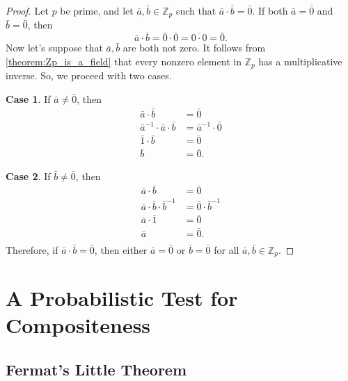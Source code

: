 \documentclass[12pt, titlepage]{amsart}
\newcommand\Z{{\mathbb Z}}
\newcommand\N{{\mathbb N}}
\newtheorem{theorem}{Theorem}[subsection]
\theoremstyle{definition}
\begin{document}
	\begin{proof}
		Let $p$ be prime, and let $\bar{a}, \bar{b} \in \Z_p$ such that $\bar{a} \cdot \bar{b} = \bar{0}$.
		If both $\bar{a} = \bar{0}$ and $\bar{b} = \bar{0}$, then $$\bar{a} \cdot \bar{b} = \bar{0} \cdot \bar{0} = \overline{0 \cdot 0} = \bar{0}.$$
		Now let's suppose that $\bar{a}, \bar{b}$ are both not zero.
		It follows from \cref{theorem:Zp_is_a_field} that every nonzero element in $\Z_p$ has a multiplicative inverse.
		So, we proceed with two cases.
		
		\textbf{Case 1}. If $\bar{a} \neq \bar{0}$, then 
		\begin{align*}
			\bar{a} \cdot \bar{b} &= \bar{0} \\
			\bar{a}^{-1} \cdot \bar{a} \cdot \bar{b} &= \bar{a}^{-1} \cdot \bar{0} \\
			\bar{1} \cdot \bar{b} &= \bar{0} \\
			\bar{b} &= \bar{0}.
		\end{align*}
		
		\textbf{Case 2}. If $\bar{b} \neq \bar{0}$, then 
		\begin{align*}
		\bar{a} \cdot \bar{b} &= \bar{0} \\
		\bar{a} \cdot \bar{b} \cdot \bar{b}^{-1} &= \bar{0} \cdot \bar{b}^{-1} \\
		\bar{a} \cdot \bar{1} &= \bar{0} \\
		\bar{a} &= \bar{0}. \\
		\end{align*}
		Therefore, if $\bar{a} \cdot \bar{b} = \bar{0}$, then either $\bar{a} = \bar{0}$ or $\bar{b} = \bar{0}$ for all $\bar{a}, \bar{b} \in \Z_p$.
				
	\end{proof}
	
	
	
	\section{A Probabilistic Test for Compositeness}\label{section:tests}

	\subsection{Fermat's Little Theorem}
	
\end{document}
